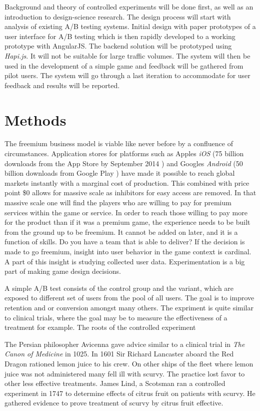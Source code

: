 \documentclass[english,12pt,a4paper,pdftex,elec,utf8]{aaltothesis}
\begin{document}
Background and theory of controlled experiments will be done first, as well as an introduction to design-science research. The design process will start with analysis of existing A/B testing systems. Initial design with paper prototypes of a user interface for A/B testing which is then rapidly developed to a working prototype with AngularJS. The backend solution will be prototyped using \textit{Hapi.js}. It will not be suitable for large traffic volumes. The system will then be used in the development of a simple game and feedback will be gathered from pilot users. The system will go through a last iteration to accommodate for user feedback and results will be reported.

\clearpage

\section{Methods}
The freemium business model is viable like never before by a confluence of circumstances. Application stores for platforms such as Apples \textit{iOS} (75 billion downloads from the App Store by September 2014 \cite{Perez2014}) and Googles \textit{Android} (50 billion downloads from Google Play \cite{Victor2013}) have made it possible to reach global markets instantly with a marginal cost of production. This combined with price point \$0 allows for massive scale as inhibitors for easy access are removed. In that massive scale one will find the players who are willing to pay for premium services within the game or service.\cite{Seufert2013} In order to reach those willing to pay more for the product than if it was a premium game, the experience needs to be built from the ground up to be freemium. It cannot be added on later, and it is a function of skills. Do you have a team that is able to deliver?\cite{Seufert2013} If the decision is made to go freemium, insight into user behavior in the game context is cardinal. A part of this insight is studying collected user data. Experimentation is a big part of making game design decisions.

A simple A/B test consists of the control group and the variant, which are exposed to different set of users from the pool of all users. The goal is to improve retention and or conversion amongst many others. The expriment is quite similar to clinical trials, where the goal may be to measure the effectiveness of a treatment for example. The roots of the controlled experiment

The Persian philosopher Avicenna gave advice similar to a clinical trial in \textit{The Canon of Medicine} in 1025. In 1601 Sir Richard Lancaster aboard the Red Dragon rationed lemon juice to his crew. On other ships of the fleet where lemon juice was not administered many fell ill with scurvy. The practice lost favor to other less effective treatments. James Lind, a Scotsman ran a controlled experiment in 1747 to determine effects of citrus fruit on patients with scurvy. He gathered evidence to prove treatment of scurvy by citrus fruit effective.\cite{Mellick2009}
\end{document}
